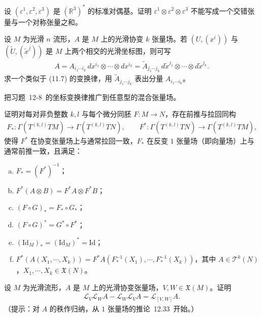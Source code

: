 \documentclass[../../main.tex]{subfiles}
\begin{document}
\begin{exercise}\label{exercise:ch12-07}
设 $(\varepsilon^1,\varepsilon^2,\varepsilon^3)$ 是 $(\mathbb{R}^3)^*$ 的标准对偶基。证明 $\varepsilon^1\otimes\varepsilon^2\otimes\varepsilon^3$ 不能写成一个交错张量与一个对称张量之和。
\end{exercise}

\begin{exercise}\label{exercise:ch12-08}
设 $M$ 为光滑 $n$ 流形，$A$ 是 $M$ 上的光滑协变 $k$ 张量场。若 $(U,(x^i))$ 与 $(\widetilde U,(\widetilde x^j))$ 是 $M$ 上两个相交的光滑坐标图，则可写
\begin{align*}
A=A_{i_1\cdots  i_k}\,dx^{i_1}\otimes\cdots\otimes dx^{i_k}
=\widetilde A_{j_1\cdots  j_k}\,d\widetilde x^{j_1}\otimes\cdots\otimes d\widetilde x^{j_k}.
\end{align*}
求一个类似于 (11.7) 的变换律，用 $\widetilde A_{j_1\cdots  j_k}$ 表出分量 $A_{i_1\cdots  i_k}$。
\end{exercise}

\begin{exercise}\label{exercise:ch12-09}
把习题~12-8~的坐标变换律推广到任意型的混合张量场。
\end{exercise}

\begin{exercise}\label{exercise:ch12-10}
证明对每对非负整数 $k,l$ 与每个微分同胚 $F\colon M\to N$，存在前推与拉回同构
\begin{align*}
F_*\colon\Gamma(T^{(k,l)}TM)\to\Gamma(T^{(k,l)}TN),\qquad
F^*\colon\Gamma(T^{(k,l)}TN)\to\Gamma(T^{(k,l)}TM),
\end{align*}
使得 $F^*$ 在协变张量场上与通常拉回一致，$F_*$ 在反变 $1$ 张量场（即向量场）上与通常前推一致，且满足：
\begin{enumerate}[(a)]
\item $F_*=(F^*)^{-1}$；
\item $F^*(A\otimes B)=F^*A\otimes F^*B$；
\item $(F\circ G)_*=F_*\circ G_*$；
\item $(F\circ G)^*=G^*\circ F^*$；
\item $(\mathrm{Id}_M)_*=(\mathrm{Id}_M)^*=\mathrm{Id}$；
\item $F^*(A(X_1,\cdots ,X_k))=F^*A(F_*^{-1}(X_1),\cdots ,F_*^{-1}(X_k))$，其中 $A\in\mathcal T^k(N)$，$X_1,\cdots ,X_k\in\mathfrak X(N)$。
\end{enumerate}
\end{exercise}

\begin{exercise}\label{exercise:ch12-11}
设 $M$ 为光滑流形，$A$ 是 $M$ 上的光滑协变张量场，$V,W\in\mathfrak X(M)$。证明
\begin{align*}
\mathcal L_V\mathcal L_W A-\mathcal L_W\mathcal L_V A=\mathcal L_{[V,W]}A.
\end{align*}
（提示：对 $A$ 的秩作归纳，从 $1$ 张量场的推论~12.33~开始。）
\end{exercise}
\end{document}
